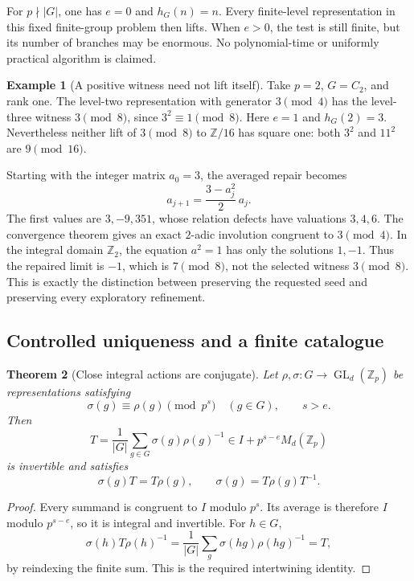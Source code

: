 \documentclass[11pt]{article}
\newtheorem{theorem}{Theorem}[section]
\theoremstyle{definition}
\newtheorem{example}[theorem]{Example}
\theoremstyle{remark}
\begin{document}
For $p\nmid|G|$, one has $e=0$ and $h_G(n)=n$. Every finite-level representation in this fixed finite-group problem then lifts. When $e>0$, the test is still finite, but its number of branches may be enormous. No polynomial-time or uniformly practical algorithm is claimed.

\begin{example}[A positive witness need not lift itself]\label{ex:horizon-witness}
Take $p=2$, $G=C_2$, and rank one. The level-two representation with generator $3\pmod4$ has the level-three witness $3\pmod8$, since $3^2\equiv1\pmod8$. Here $e=1$ and $h_G(2)=3$. Nevertheless neither lift of $3\pmod8$ to $\mathbb Z/16$ has square one: both $3^2$ and $11^2$ are $9\pmod{16}$.

Starting with the integer matrix $a_0=3$, the averaged repair becomes
\[
 a_{j+1}=\frac{3-a_j^2}{2}\,a_j.
\]
The first values are $3,-9,351$, whose relation defects have valuations $3,4,6$. The convergence theorem gives an exact $2$-adic involution congruent to $3\pmod4$. In the integral domain $\mathbb Z_2$, the equation $a^2=1$ has only the solutions $1,-1$. Thus the repaired limit is $-1$, which is $7\pmod8$, not the selected witness $3\pmod8$. This is exactly the distinction between preserving the requested seed and preserving every exploratory refinement.
\end{example}

\subsection{Controlled uniqueness and a finite catalogue}

\begin{theorem}[Close integral actions are conjugate]\label{thm:close-action-conjugacy}
Let $\rho,\sigma:G\to\operatorname{GL}_d(\mathbb Z_p)$ be representations satisfying
\[
 \sigma(g)\equiv\rho(g)\pmod{p^s}\quad(g\in G),\qquad s>e.
\]
Then
\[
 T=\frac1{|G|}\sum_{g\in G}\sigma(g)\rho(g)^{-1}
 \in I+p^{s-e}M_d(\mathbb Z_p)
\]
is invertible and satisfies
\[
 \sigma(g)T=T\rho(g),\qquad
 \sigma(g)=T\rho(g)T^{-1}.
\]
\end{theorem}
\begin{proof}
Every summand is congruent to $I$ modulo $p^s$. Its average is therefore $I$ modulo $p^{s-e}$, so it is integral and invertible. For $h\in G$,
\[
 \sigma(h)T\rho(h)^{-1}
 =\frac1{|G|}\sum_g\sigma(hg)\rho(hg)^{-1}=T,
\]
by reindexing the finite sum. This is the required intertwining identity.
\end{proof}
\end{document}

